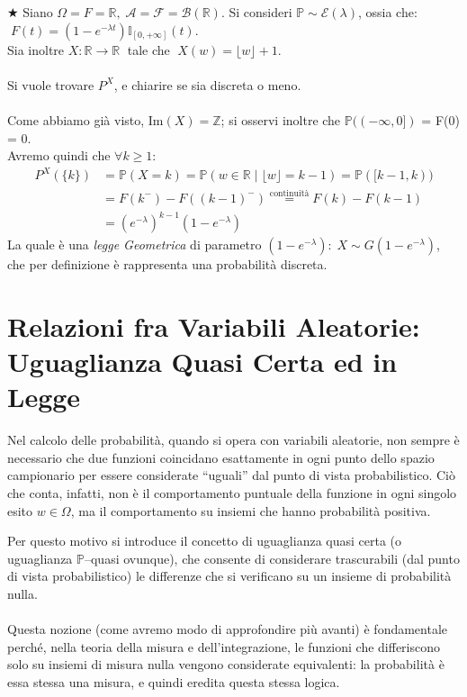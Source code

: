 \begin{esempio}
\(\bigstar\) Siano $\Omega = F = \mathbb{R}, \; \mathcal{A}= \mathcal{F} = \mathcal{B}(\mathbb{R})$. Si consideri $\mathbb{P} \sim \mathcal{E}(\lambda)$, ossia che: \(\;F(t) = (1-e^{-\lambda t}) \mathbb{I}_{[0, +\infty]}(t)\).\\
Sia inoltre $X:\mathbb{R}\to\mathbb{R}\;$ tale che $\;X(w) = \lfloor w\rfloor + 1$.\\
\\
Si vuole trovare $P^X$, e chiarire se sia discreta o meno.\\
\\
Come abbiamo già visto, $\text{Im}(X) = \mathbb{Z}$; si osservi inoltre che $\mathbb{P}((-\infty, 0])$ = F(0) = 0.\\
    Avremo quindi che $\forall k \geq 1$:
    \begin{align*}
        P^X (\{k\})&= \mathbb{P}(X=k) = \mathbb{P}(w\in\mathbb{R}\mid \lfloor w \rfloor = k-1) = \mathbb{P}([k-1, k)) \\
        & = F(k^-) - F((k-1)^-) \overset{\text{continuità}}{=} F(k) - F(k-1) \\
        & = (e^{-\lambda})^{k-1}(1-e^{-\lambda})
    \end{align*}
La quale è una \textit{legge Geometrica} di parametro $(1-e^{-\lambda}):\; X\sim G(1-e^{-\lambda})$, che per definizione è rappresenta una probabilità discreta.
\end{esempio}

\section{Relazioni fra Variabili Aleatorie: Uguaglianza Quasi Certa ed in Legge}
Nel calcolo delle probabilità, quando si opera con variabili aleatorie, non sempre è necessario che due funzioni coincidano esattamente in ogni punto dello spazio campionario per essere considerate “uguali” dal punto di vista probabilistico.
Ciò che conta, infatti, non è il comportamento puntuale della funzione in ogni singolo esito $w\in\Omega$, ma il comportamento su insiemi che hanno probabilità positiva.

\medskip
\noindent Per questo motivo si introduce il concetto di uguaglianza quasi certa (o uguaglianza $\mathbb{P}$--quasi ovunque), che consente di considerare trascurabili (dal punto di vista probabilistico) le differenze che si verificano su un insieme di probabilità nulla.\\
\\
\noindent Questa nozione (come avremo modo di approfondire più avanti) è fondamentale perché, nella teoria della misura e dell’integrazione, le funzioni che differiscono solo su insiemi di misura nulla vengono considerate equivalenti: la probabilità è essa stessa una misura, e quindi eredita questa stessa logica.

